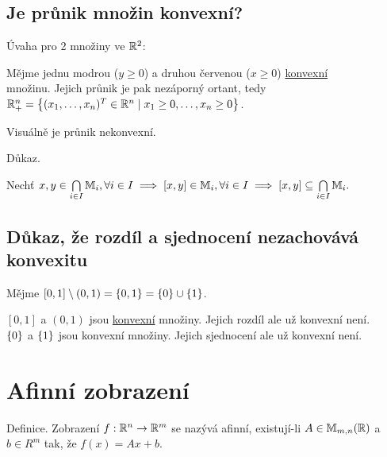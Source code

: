 \subsection{Je průnik množin konvexní?}
Úvaha pro 2 množiny ve $\mathbb{R}^2$:

\begin{wrapfigure}{r}{0.25\textwidth}
    \vspace{-6em}
    \hspace*{-2em}
\end{wrapfigure}

Mějme jednu modrou ($y \geq 0$) a druhou červenou ($x \geq 0$) \hyperref[sec:konvex]{konvexní} \\ množinu. Jejich průnik 
je pak nezáporný ortant, tedy \\
$\mathbb{R}_+^n = \left\lbrace (x_1, \dots, x_n)^T \in \mathbb{R}^n \mid x_1 \geq 0, \dots, x_n \geq 0 \right\rbrace$.

Visuálně je průnik nekonvexní.

Důkaz.

Nechť ${x,y \in \bigcap\limits_{i \in I} \mathbb{M}_{i}, \forall i \in I \implies [x, y] \in \mathbb{M}_i, \forall i \in I
\implies [x,y] \subseteq \bigcap\limits_{i \in I} \mathbb{M}_{i}.}$

\subsection{Důkaz, že rozdíl a sjednocení nezachovává konvexitu}
Mějme $[0,1] \setminus (0,1) = \left\lbrace 0,1 \right\rbrace = \left\lbrace 0 \right\rbrace \cup \left\lbrace 1 \right\rbrace$.

$[0,1]$ a $(0,1)$ jsou \hyperref[sec:konvex]{konvexní} množiny. Jejich rozdíl ale už konvexní není.\\
$\left\lbrace 0 \right\rbrace$ a $\left\lbrace 1 \right\rbrace$ jsou konvexní množiny. Jejich sjednocení ale už konvexní není.

\section*{Afinní zobrazení} \label{sec:afin}
Definice. Zobrazení $f: \mathbb{R}^n \rightarrow \mathbb{R}^m$ se nazývá afinní, existují-li $A \in \mathbb{M}_{m,n} (\mathbb{R})$ a $b \in R^m$
tak, že $f(x) = Ax + b$.

